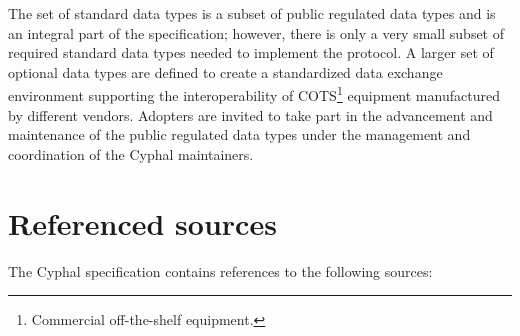 The set of standard data types is a subset of public regulated data types and is an integral part of the specification;
however, there is only a very small subset of required standard data types needed to implement the protocol.
A larger set of optional data types are defined to create a standardized data exchange environment
supporting the interoperability of COTS\footnote{Commercial off-the-shelf equipment.}
equipment manufactured by different vendors.
Adopters are invited to take part in the advancement and maintenance of the public regulated data types
under the management and coordination of the Cyphal maintainers.

\section{Referenced sources}

The Cyphal specification contains references to the following sources:

